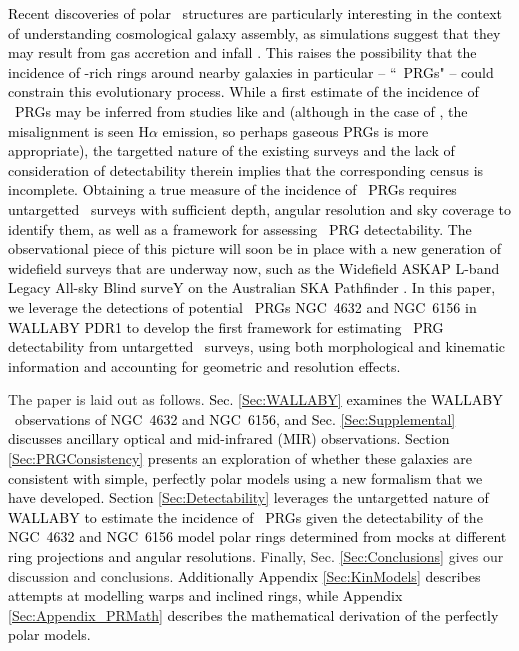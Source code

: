 \documentclass[fleqn,usenatbib]{mnras}
\newcommand{\hi}{\text{H\,\sc{i}}}
\newcommand{\KS}[1]{\textcolor{black}{#1}}
\begin{document}
\KS{Recent discoveries of polar \hi\ structures are particularly interesting in the context of understanding cosmological galaxy assembly, as simulations suggest that they may result from gas accretion and infall \citep{Khoperskov2021}. This raises the possibility that the incidence of \hi-rich rings around nearby galaxies in particular -- ``\hi\ PRGs" -- could constrain this evolutionary process. While a first estimate of the incidence of \hi\ PRGs may be inferred from studies like \citet{Serra2012} 
\textcolor{black}{and \citet{Cao2022} (although in the case of \citet{Cao2022}, the misalignment is seen H$\alpha$ emission, so perhaps gaseous PRGs is more appropriate)}, the targetted nature of the existing surveys and the lack of consideration of detectability therein implies that the corresponding census is incomplete.  Obtaining a true measure of the incidence of \hi\ PRGs requires untargetted \hi\ surveys with sufficient depth, angular resolution and sky coverage to identify them, as well as a framework for assessing \hi\ PRG detectability. The observational piece of this picture will soon be in place with a new generation of widefield surveys that are underway now, such as the Widefield ASKAP L-band Legacy All-sky Blind surveY \citep[WALLABY,][]{Koribalski2020} on the Australian SKA Pathfinder \citep{Johnston2008,Hotan2021}. In this paper, we leverage the detections of potential \hi\ PRGs NGC~4632 and NGC~6156 in WALLABY PDR1 to develop the first framework for estimating \hi\ PRG detectability from untargetted \hi\ surveys, using both morphological and kinematic information and accounting for geometric and resolution effects.}


The paper is laid out as follows.  \textcolor{black}{Sec. \ref{Sec:WALLABY} examines the WALLABY \hi\ observations of NGC~4632 and NGC~6156, and Sec. \ref{Sec:Supplemental} discusses ancillary optical and mid-infrared (MIR) observations.  %
\textcolor{black}{Section \ref{Sec:PRGConsistency} presents an exploration of whether these galaxies are consistent with simple, perfectly polar models} using a new formalism that we have developed.  Section \ref{Sec:Detectability} leverages the untargetted nature of WALLABY to estimate the incidence of \hi\ PRGs given the detectability of the NGC~4632 and NGC~6156 model polar rings determined from mocks at different ring projections and angular resolutions.}  Finally, Sec. \ref{Sec:Conclusions} gives our discussion and conclusions.  \textcolor{black}{Additionally Appendix \ref{Sec:KinModels} describes attempts at modelling warps and inclined rings, while Appendix \ref{Sec:Appendix_PRMath} describes the mathematical derivation of the perfectly polar models.}
\end{document}

